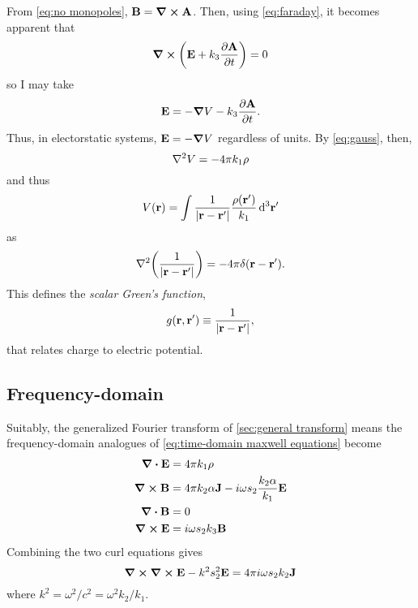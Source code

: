 From \cref{eq:no monopoles}, $\vb{B} = \curl{\vb{A}}$. 
Then, using \cref{eq:faraday}, it becomes apparent that
\begin{equation*}
  \curl{\qty(\vb{E} + k_3 \pdv{\vb{A}}{t})} = 0
\end{equation*}
so I may take
\begin{equation*}
  \vb{E} = -\grad{V} - k_3 \pdv{\vb{A}}{t}.
\end{equation*}
Thus, in electorstatic systems, $\vb{E} = -\grad{V}$ regardless of units.
By \cref{eq:gauss}, then,
\begin{equation*}
  \laplacian V = -4 \pi k_1 \rho
\end{equation*}
and thus
\begin{equation*}
  V(\vb{r}) = \int \frac{1}{\abs{\vb{r} - \vb{r}'}} \frac{\rho(\vb{r}')}{k_1} \dd[3]{\vb{r}'}
\end{equation*}
as
\begin{equation*}
  \laplacian \qty(\frac{1}{\abs{\vb{r} - \vb{r}'}}) = -4 \pi \delta(\vb{r} - \vb{r}').
\end{equation*}
This defines the \emph{scalar Green's function},
\begin{equation}
  g(\vb{r}, \vb{r}') \equiv \frac{1}{\abs{\vb{r} - \vb{r}'}},
  \label{eq:scalar green}
\end{equation}
that relates charge to electric potential.

\subsection{Frequency-domain}
Suitably, the generalized Fourier transform of \cref{sec:general transform} means the frequency-domain analogues of \cref{eq:time-domain maxwell equations}
become
\begin{subequations}
  \begin{align}
    \div{\vb{E}} &= 4 \pi k_1 \rho \\
    \curl{\vb{B}} &= 4 \pi k_2 \alpha \vb{J} - i \omega s_2 \frac{k_2 \alpha}{k_1} \vb{E} \\
    \div{\vb{B}} &= 0 \\
    \curl{\vb{E}} &= i \omega s_2 k_3 \vb{B}
  \end{align}
  \label{eq:frequency-domain maxwell equations}
\end{subequations}
Combining the two curl equations gives
\begin{equation}
  \curl{\curl{\vb{E}}} - k^2 s_2^2 \vb{E} = 4 \pi i \omega s_2 k_2 \vb{J}
\end{equation}
where $k^2 = \omega^2/c^2 = \omega^2 k_2/k_1$.
